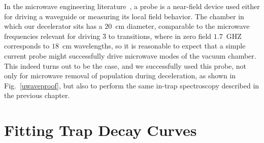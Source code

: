 In the microwave engineering literature~\cite[Sec.~4.7]{Pozar2009}, a probe is a near-field device used either for driving a waveguide or measuring its local field behavior. 
The chamber in which our decelerator sits has a $20$~cm diameter, comparable to the microwave frequencies relevant for driving \f3 to  transitions, where in zero field $1.7$~GHZ corresponds to $18$~cm wavelengths, so it is reasonable to expect that a simple current probe might successfully drive microwave modes of the vacuum chamber.
This indeed turns out to be the case, and we successfully used this probe, not only for microwave removal of population during deceleration, as shown in Fig.~\ref{uwaveproof}, but also to perform the same in-trap spectroscopy described in the previous chapter.

\section{Fitting Trap Decay Curves}

